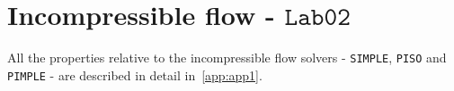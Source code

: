 
\section{Incompressible flow - $\mathtt{Lab02}$}

    \renewcommand{\thepage}{\arabic{page}}
    \setcounter{page}{\thelastPage}

All the properties relative to the incompressible flow solvers - \verb|SIMPLE|, \verb|PISO| and \verb|PIMPLE| - are described in detail in~\ref{app:app1}. 



